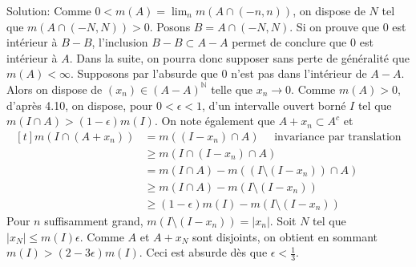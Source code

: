 \documentclass{report}
\begin{document}
Solution: Comme $0<m(A) = \lim_n m(A \cap (-n,n))$, on dispose de $N$ tel que $m(A\cap (-N,N))>0$. Posons $B=A \cap (-N,N)$. Si on prouve que $0$ est intérieur à $B-B$, l'inclusion $B-B\subset A-A$ permet de conclure que $0$ est intérieur à $A$. Dans la suite, on pourra donc supposer sans perte de généralité que $m(A)<\infty$. \newline \newline 
Supposons par l'absurde que $0$ n'est pas dans l'intérieur de $A-A$. Alors on dispose de $(x_n) \in (A-A)^{\mathbb N}$ telle que $x_n\to 0$.\newline
Comme $m(A)>0$, d'après 4.10, on dispose, pour $0<\epsilon<1$, d'un intervalle ouvert borné $I$ tel que $m(I\cap A) > (1-\epsilon)m(I)$. \newline
On note également que $A+x_n\subset A^c$ et $$\begin{aligned}[t] m(I \cap (A + x_n )) &= m((I-x_n)\cap A) \quad \text{ invariance par translation} \\
&\geq m(I\cap (I-x_n)\cap A) \\
&= m(I\cap A) -  m((I\setminus (I-x_n)) \cap A) \\ 
&\geq m(I\cap A) - m(I\setminus (I-x_n))\\
&\geq (1-\epsilon)m(I) - m(I\setminus (I-x_n))
\end{aligned}$$ 
Pour $n$ suffisamment grand, $m(I\setminus (I-x_n)) =  |x_n|$. Soit $N$ tel que $|x_N|\leq  m(I)\epsilon$.\newline
Comme $A$ et $A+x_N$ sont disjoints, on obtient en sommant $m(I)> (2-3\epsilon)m(I)$.\newline
Ceci est absurde dès que $\epsilon <\frac 13$.

\newpage
\end{document}
